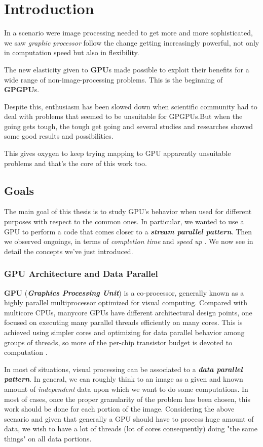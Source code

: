 
\chapter{Introduction}
\label{chap:intro}
In a scenario were image processing needed to get more and more sophisticated, we saw \textit{graphic processor} follow the change getting increasingly powerful, not only in computation speed but also in flexibility.

The new elasticity given to \textbf{GPU}s made possible to exploit their benefits for a wide range of non-image-processing problems. This is the beginning of \textbf{GPGPU}s.

Despite this, enthusiasm has been slowed down when scientific community had to deal with problems that seemed to be unsuitable for GPGPUs.But when the going gets tough, the tough get going and several studies and researches showed some good results and possibilities.

This gives oxygen to keep trying mapping to GPU apparently unsuitable problems and that's the core of this work too.

\section{Goals}
	The main goal of this thesis is to study GPU's behavior when used for different purposes with respect to the common ones.
	In particular, we wanted to use a GPU to perform a code that comes closer to a \textit{\textbf{stream parallel pattern}}.	
	Then we observed ongoings, in terms of  \textit{completion time} and \textit{speed up }.
	We now see in detail the concepts we've just introduced.

\subsection{GPU Architecture and Data Parallel}
	\textbf{GPU} (\textbf{\textit{Graphics Processing Unit}}) is a co-processor, generally known as a highly parallel multiprocessor optimized for visual computing.
	Compared with multicore CPUs, manycore GPUs have different architectural design points, one focused on executing many parallel threads efficiently on many cores.
	This is achieved using simpler cores and  optimizing for data parallel behavior among  groups of threads, so more of the per-chip  transistor budget is devoted to computation \cite{pattersonhennessy}.
	
	In most of situations, visual processing can be associated to a \textbf{\textit{data parallel pattern}}.
	In general, we can roughly think to an image as a given and known amount of \textit{independent} data upon which we want to do some computations. In most of cases, once the proper granularity of the problem has been chosen, this work should be done for each portion of the image.
	Considering the above scenario and given that generally a GPU should have to process huge amount of data, we wish to have a lot of threads (lot of cores consequently) doing "the same things" on all data portions.
	
